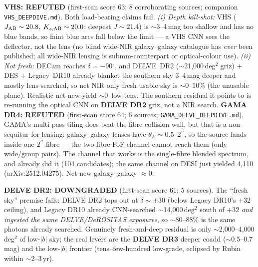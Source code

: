 \documentclass[11pt,letterpaper]{article}
\providecommand{\degree}{\ensuremath{^\circ}}
\providecommand{\arcsec}{\ensuremath{^{\prime\prime}}}
\newcommand{\survey}[1]{\textbf{#1}}
\begin{document}
\textbf{VHS: REFUTED} (first-scan score 63; 8 corroborating sources; companion
\texttt{VHS\_DEEPDIVE.md}). Both load-bearing claims fail. \emph{(i) Depth kill-shot:} VHS
($J_{\rm AB}\sim20.8$, $K_{s,\rm AB}\sim20.0$; deepest $J\sim21.4$) is $\sim$3--4\,mag too shallow
and has no blue bands, so faint blue arcs fall below the limit --- a VHS CNN sees the deflector,
not the lens (no blind wide-NIR galaxy--galaxy catalogue has \emph{ever} been published; all
wide-NIR lensing is submm-counterpart or optical-colour use). \emph{(ii) Not fresh:} DECam reaches
$\delta=-90\degree$, and DELVE~DR2 ($\sim$21{,}000\,deg$^2$ griz) $+$ DES $+$ Legacy~DR10 already
blanket the southern sky 3--4\,mag deeper and mostly lens-searched, so net NIR-only fresh usable
sky is $\sim$0--10\% (the unusable plane). Realistic net-new yield $\sim$0--low-tens. The southern
residual it points to is re-running the optical CNN on \survey{DELVE DR2} griz, not a NIR search.
\textbf{GAMA DR4: REFUTED} (first-scan score 64; 6 sources; \texttt{GAMA\_DELVE\_DEEPDIVE.md}).
GAMA's multi-pass tiling does beat the fibre-collision wall, but that is a non-sequitur for
lensing: galaxy--galaxy lenses have $\theta_E\sim0.5$--$2\arcsec$, so the source lands inside one
$2\arcsec$ fibre --- the two-fibre FoF channel cannot reach them (only wide/group pairs). The
channel that works is the single-fibre blended spectrum, and \citet{holwerda2015} already did it
(104 candidates); the same channel on DESI just yielded 4{,}110 (arXiv:2512.04275). Net-new
galaxy--galaxy $\approx0$.

\textbf{DELVE DR2: DOWNGRADED} (first-scan score 61; 5 sources). The ``fresh sky'' premise fails:
DELVE DR2 tops out at $\delta\sim+30$ (below Legacy DR10's $+32$ ceiling), and Legacy DR10
\citep{inchausti2025} already CNN-searched $\sim$14{,}000\,deg$^2$ south of $+32$ \emph{and ingested
the same DELVE/DeROSITAS exposures}, so $\sim$80--88\% is the same photons already searched.
Genuinely fresh-and-deep residual is only $\sim$2{,}000--4{,}000\,deg$^2$ of low-$|b|$ sky; the real
levers are the \survey{DELVE DR3} deeper coadd ($\sim$0.5--0.7\,mag) and the low-$|b|$ frontier
(tens--few-hundred low-grade, eclipsed by Rubin within $\sim$2--3\,yr).
\end{document}
